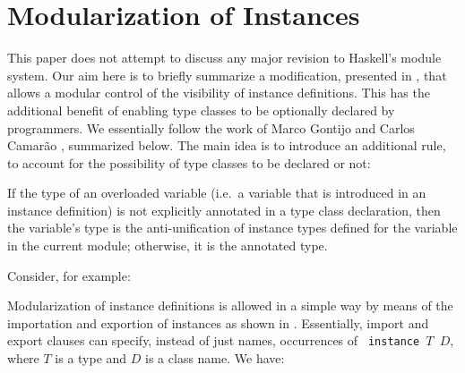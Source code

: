 \section{Modularization of Instances}
\label{sec:modular-instances}

This paper does not attempt to discuss any major revision to Haskell's
module system. Our aim here is to briefly summarize a modification,
presented in \cite{Controlling-scope-instances}, that allows a modular
control of the visibility of instance definitions. This has the
additional benefit of enabling type classes to be optionally declared
by programmers. We essentially follow the work of Marco Gontijo and
Carlos Camarão \cite{Controlling-scope-instances}, summarized
below. The main idea is to introduce an additional rule, to account
for the possibility of type classes to be declared or not:

\begin{definition}

If the type of an overloaded variable (i.e.~a variable that is
introduced in an instance definition) is not explicitly annotated in a
type class declaration, then the variable's type is the
anti-unification of instance types defined for the variable in the
current module; otherwise, it is the annotated type.

\label{overloaded-variable-type}
\end{definition}

Consider, for example:



            
Modularization of instance definitions is allowed in a simple way by
means of the importation and exportion of instances as shown in
\cite{Controlling-scope-instances}. Essentially, import and export
clauses can specify, instead of just names, occurrences of {\tt
  instance $T$ $D$}, where $T$ is a type and $D$ is a class name.
We have: 

